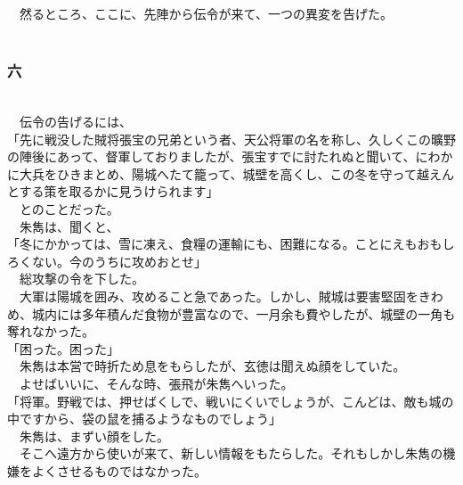 \documentclass[
  paper=a5,
  fontsize=10pt,
  jafontsize=9.5pt,
  tate,                  %
  open_bracket_pos=nibu, %
]{jlreq}
\begin{document}
　然るところ、ここに、先陣から伝令が来て、一つの異変を告げた。\\

\\

\subsubsection{六}

\\


　伝令の告げるには、\\


「先に戦没した賊将張宝の兄弟という者、天公将軍の名を称し、久しくこの曠野の陣後にあって、督軍しておりましたが、張宝すでに討たれぬと聞いて、にわかに大兵をひきまとめ、陽城へたて籠って、城壁を高くし、この冬を守って越えんとする策を取るかに見うけられます」\\


　とのことだった。\\


　朱雋は、聞くと、\\


「冬にかかっては、雪に凍え、食糧の運輸にも、困難になる。ことにえもおもしろくない。今のうちに攻めおとせ」\\


　総攻撃の令を下した。\\


　大軍は陽城を囲み、攻めること急であった。しかし、賊城は要害堅固をきわめ、城内には多年積んだ食物が豊富なので、一月余も費やしたが、城壁の一角も奪れなかった。\\


「困った。困った」\\


　朱雋は本営で時折ため息をもらしたが、玄徳は聞えぬ顔をしていた。\\


　よせばいいに、そんな時、張飛が朱雋へいった。\\


「将軍。野戦では、押せばくしで、戦いにくいでしょうが、こんどは、敵も城の中ですから、袋の鼠を捕るようなものでしょう」\\


　朱雋は、まずい顔をした。\\


　そこへ遠方から使いが来て、新しい情報をもたらした。それもしかし朱雋の機嫌をよくさせるものではなかった。\\
\end{document}
